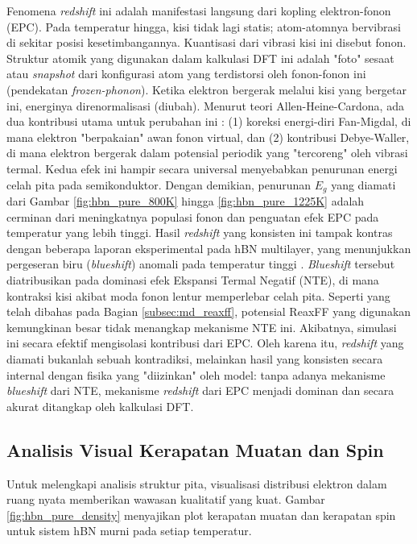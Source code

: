 Fenomena \emph{redshift} ini adalah manifestasi langsung dari kopling elektron-fonon (EPC).
Pada temperatur hingga, kisi tidak lagi statis; atom-atomnya bervibrasi di sekitar posisi kesetimbangannya. Kuantisasi dari vibrasi kisi ini disebut fonon.
Struktur atomik yang digunakan dalam kalkulasi DFT ini adalah "foto" sesaat atau \emph{snapshot} dari konfigurasi atom yang terdistorsi oleh fonon-fonon ini (pendekatan \emph{frozen-phonon}).
Ketika elektron bergerak melalui kisi yang bergetar ini, energinya direnormalisasi (diubah).
Menurut teori Allen-Heine-Cardona, ada dua kontribusi utama untuk perubahan ini \citep{Allen1983}: (1) koreksi energi-diri Fan-Migdal, di mana elektron "berpakaian" awan fonon virtual, dan (2) kontribusi Debye-Waller, di mana elektron bergerak dalam potensial periodik yang "tercoreng" oleh vibrasi termal.
Kedua efek ini hampir secara universal menyebabkan penurunan energi celah pita pada semikonduktor.
Dengan demikian, penurunan $E_g$ yang diamati dari Gambar \ref{fig:hbn_pure_800K} hingga \ref{fig:hbn_pure_1225K} adalah cerminan dari meningkatnya populasi fonon dan penguatan efek EPC pada temperatur yang lebih tinggi.
Hasil \emph{redshift} yang konsisten ini tampak kontras dengan beberapa laporan eksperimental pada hBN multilayer, yang menunjukkan pergeseran biru (\emph{blueshift}) anomali pada temperatur tinggi \citep{Du2017}.
\emph{Blueshift} tersebut diatribusikan pada dominasi efek Ekspansi Termal Negatif (NTE), di mana kontraksi kisi akibat moda fonon lentur memperlebar celah pita.
Seperti yang telah dibahas pada Bagian \ref{subsec:md_reaxff}, potensial ReaxFF yang digunakan kemungkinan besar tidak menangkap mekanisme NTE ini.
Akibatnya, simulasi ini secara efektif mengisolasi kontribusi dari EPC. Oleh karena itu, \emph{redshift} yang diamati bukanlah sebuah kontradiksi, melainkan hasil yang konsisten secara internal dengan fisika yang "diizinkan" oleh model: tanpa adanya mekanisme \emph{blueshift} dari NTE, mekanisme \emph{redshift} dari EPC menjadi dominan dan secara akurat ditangkap oleh kalkulasi DFT.

\subsection{Analisis Visual Kerapatan Muatan dan Spin}
\label{subsec:hbn_pure_density_analysis}
Untuk melengkapi analisis struktur pita, visualisasi distribusi elektron dalam ruang nyata memberikan wawasan kualitatif yang kuat.
Gambar \ref{fig:hbn_pure_density} menyajikan plot kerapatan muatan dan kerapatan spin untuk sistem hBN murni pada setiap temperatur.

